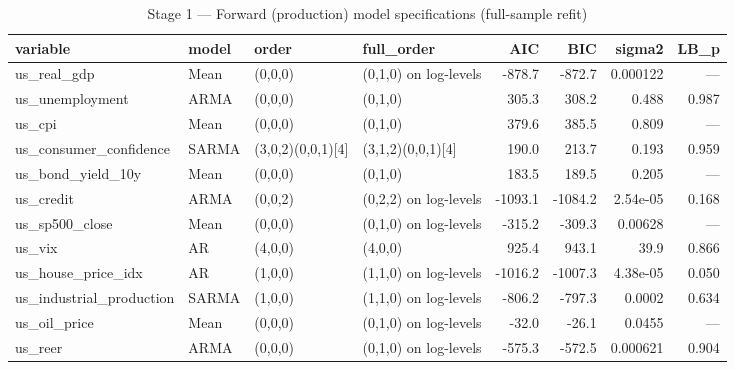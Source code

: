 \begin{table}[htbp]
\centering
\caption{Stage 1 — Forward (production) model specifications (full-sample refit)}
\label{tab:model_specs}
\begin{tabular}{llllrrrr}
\toprule
variable & model & order & full\_order & AIC & BIC & sigma2 & LB\_p \\
\midrule
us\_real\_gdp & Mean & (0,0,0) & (0,1,0) on log-levels & -878.7 & -872.7 & 0.000122 & — \\
us\_unemployment & ARMA & (0,0,0) & (0,1,0) & 305.3 & 308.2 & 0.488 & 0.987 \\
us\_cpi & Mean & (0,0,0) & (0,1,0) & 379.6 & 385.5 & 0.809 & — \\
us\_consumer\_confidence & SARMA & (3,0,2)(0,0,1){[}4{]} & (3,1,2)(0,0,1){[}4{]} & 190.0 & 213.7 & 0.193 & 0.959 \\
us\_bond\_yield\_10y & Mean & (0,0,0) & (0,1,0) & 183.5 & 189.5 & 0.205 & — \\
us\_credit & ARMA & (0,0,2) & (0,2,2) on log-levels & -1093.1 & -1084.2 & 2.54e-05 & 0.168 \\
us\_sp500\_close & Mean & (0,0,0) & (0,1,0) on log-levels & -315.2 & -309.3 & 0.00628 & — \\
us\_vix & AR & (4,0,0) & (4,0,0) & 925.4 & 943.1 & 39.9 & 0.866 \\
us\_house\_price\_idx & AR & (1,0,0) & (1,1,0) on log-levels & -1016.2 & -1007.3 & 4.38e-05 & 0.050 \\
us\_industrial\_production & SARMA & (1,0,0) & (1,1,0) on log-levels & -806.2 & -797.3 & 0.0002 & 0.634 \\
us\_oil\_price & Mean & (0,0,0) & (0,1,0) on log-levels & -32.0 & -26.1 & 0.0455 & — \\
us\_reer & ARMA & (0,0,0) & (0,1,0) on log-levels & -575.3 & -572.5 & 0.000621 & 0.904 \\
\bottomrule
\end{tabular}
\end{table}
